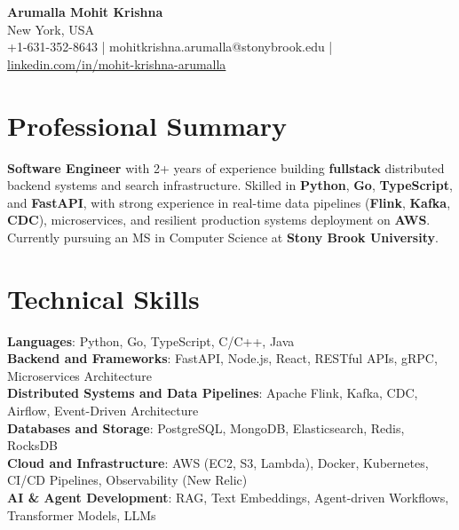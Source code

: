 \documentclass[letterpaper,11pt]{article}
\begin{document}
\begin{center}
  {\Large \textbf{Arumalla Mohit Krishna}} \\
  New York, USA \\
  +1-631-352-8643 \enspace | \enspace mohitkrishna.arumalla@stonybrook.edu \enspace | \enspace \href{https://www.linkedin.com/in/mohit-krishna-arumalla}{linkedin.com/in/mohit-krishna-arumalla}
\end{center}

\section{Professional Summary}
  \begin{itemize}[leftmargin=0.15in, label={}]
    \small{\item{
     \textbf{Software Engineer} with 2+ years of experience building \textbf{fullstack} distributed backend systems and search infrastructure. Skilled in \textbf{Python}, \textbf{Go}, \textbf{TypeScript}, and \textbf{FastAPI}, with strong experience in real-time data pipelines (\textbf{Flink}, \textbf{Kafka}, \textbf{CDC}), microservices, and resilient production systems deployment on \textbf{AWS}. Currently pursuing an MS in Computer Science at \textbf{Stony Brook University}.
    }}
  \end{itemize}
\vspace{-16pt}

\section{Technical Skills}
 \begin{itemize}[leftmargin=0.15in, label={}]
    \small{\item{
     \textbf{Languages}: Python, Go, TypeScript, C/C++, Java \\
     \textbf{Backend and Frameworks}: FastAPI, Node.js, React, RESTful APIs, gRPC, Microservices Architecture \\
     \textbf{Distributed Systems and Data Pipelines}: Apache Flink, Kafka, CDC, Airflow, Event-Driven Architecture \\
     \textbf{Databases and Storage}: PostgreSQL, MongoDB, Elasticsearch, Redis, RocksDB \\
     \textbf{Cloud and Infrastructure}: AWS (EC2, S3, Lambda), Docker, Kubernetes, CI/CD Pipelines, Observability (New Relic) \\
     \textbf{AI & Agent Development}: RAG, Text Embeddings, Agent-driven Workflows, Transformer Models, LLMs
    }}
 \end{itemize}
\vspace{-16pt}
\end{document}
